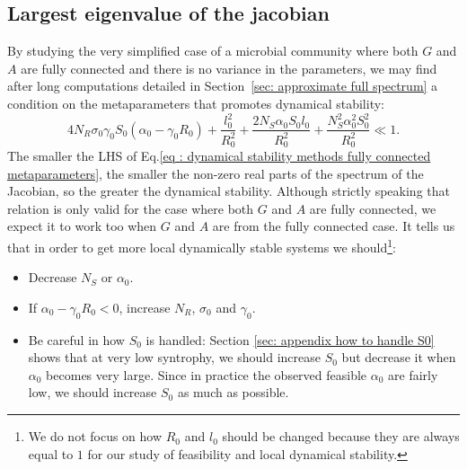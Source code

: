 \documentclass[12pt, titlepage]{report}
\begin{document}
\subsection{Largest eigenvalue of the jacobian} \label{sec: largest eigenvalue of the jacobian}
By studying the very simplified case of a microbial community where both $G$ and $A$ are fully connected and there is no variance in the parameters, we may find after long computations detailed in Section \ref{sec: approximate full spectrum} a condition on the metaparameters that promotes dynamical stability:
\begin{equation}
4N_R \sigma_0 \gamma_0 S_0  (\alpha_0 - \gamma_0 R_0) +\frac{l_0^2}{R_0^2}+\frac{2N_S\alpha_0 S_0 l_0}{R_0^2} + \frac{N_S^2 \alpha_0^2 S_0^2}{R_0^2} \ll 1. \label{eq : dynamical stability methods fully connected metaparameters}
\end{equation}
The smaller the LHS of Eq.\eqref{eq : dynamical stability methods fully connected metaparameters}, the smaller the non-zero real parts of the spectrum of the Jacobian, so the greater the dynamical stability.
Although strictly speaking that relation is only valid for the case where both $G$ and $A$ are fully connected, we expect it to work too when $G$ and $A$ are  from the fully connected case. It tells us that in order to get more local dynamically stable systems we should\footnote{We do not focus on how $R_0$ and $l_0$ should be changed because they are always equal to $1$ for our study of feasibility and local dynamical stability. }:
\begin{itemize}
  \item Decrease $N_S$ %
  or $\alpha_0$.
  \item If $\alpha_0 - \gamma_0 R_0 < 0$, increase $N _R$, $\sigma_0$ and $\gamma_0$.
  \item Be careful in how $S_0$ is handled: %
  Section \ref{sec: appendix how to handle S0} shows that at very low syntrophy, we should increase $S_0$ but decrease it when $\alpha_0$ becomes very large. Since in practice the observed feasible $\alpha_0$ are fairly low, we  should increase $S_0$ as much as possible.
\end{itemize}
\end{document}
